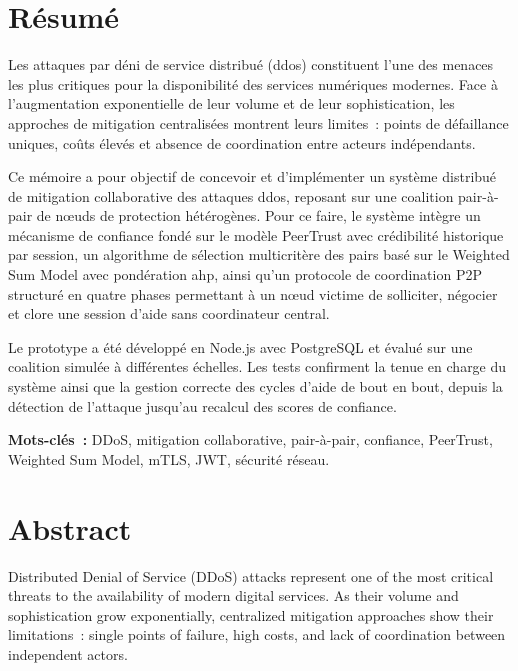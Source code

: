 

\chapter*{Résumé}

Les attaques par déni de service distribué (\gls{ddos}) constituent l'une des menaces les plus critiques pour la disponibilité des services numériques modernes. Face à l'augmentation exponentielle de leur volume et de leur sophistication, les approches de mitigation centralisées montrent leurs limites~: points de défaillance uniques, coûts élevés et absence de coordination entre acteurs indépendants.

Ce mémoire a pour objectif de concevoir et d'implémenter un système distribué de mitigation collaborative des attaques \gls{ddos}, reposant sur une coalition pair-à-pair de n\oe{}uds de protection hétérogènes. Pour ce faire, le système intègre un mécanisme de confiance fondé sur le modèle PeerTrust avec crédibilité historique par session, un algorithme de sélection multicritère des pairs basé sur le Weighted Sum Model avec pondération \gls{ahp}, ainsi qu'un protocole de coordination P2P structuré en quatre phases permettant à un n\oe{}ud victime de solliciter, négocier et clore une session d'aide sans coordinateur central.

Le prototype a été développé en Node.js avec PostgreSQL et évalué sur une coalition simulée à différentes échelles. Les tests confirment la tenue en charge du système ainsi que la gestion correcte des cycles d'aide de bout en bout, depuis la détection de l'attaque jusqu'au recalcul des scores de confiance.

\medskip
\noindent\textbf{Mots-clés~:} DDoS, mitigation collaborative, pair-à-pair, confiance, PeerTrust, Weighted Sum Model, mTLS, JWT, sécurité réseau.

\newpage

\chapter*{Abstract}

Distributed Denial of Service (DDoS) attacks represent one of the most critical threats to the availability of modern digital services. As their volume and sophistication grow exponentially, centralized mitigation approaches show their limitations~: single points of failure, high costs, and lack of coordination between independent actors.

